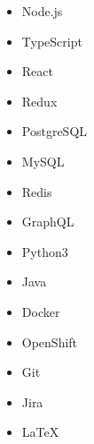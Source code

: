 

\begin{multicols}{5}
	\begin{itemize}
		\item Node.js
		\item TypeScript
		\item React
		\item Redux
		\item PostgreSQL
		\item MySQL
		\item Redis
		\item GraphQL
		\item Python3
		\item Java
		\item Docker
		\item OpenShift
		\item Git
		\item Jira
		\item LaTeX
	\end{itemize}
\end{multicols}
